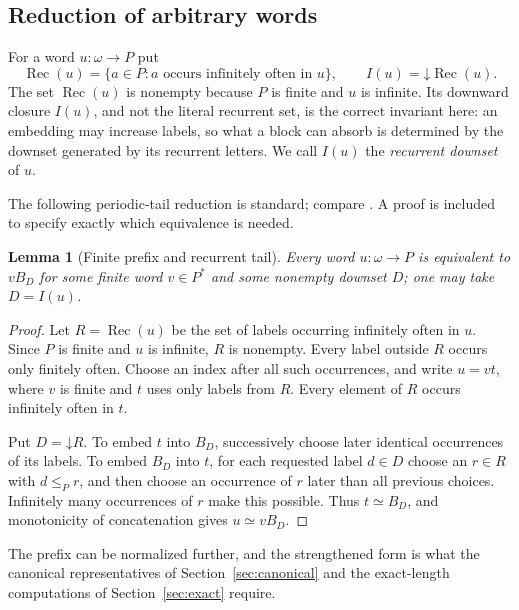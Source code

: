 \documentclass[11pt,a4paper]{article}
\numberwithin{equation}{section}
\newtheorem{lemma}[theorem]{Lemma}
\theoremstyle{definition}
\theoremstyle{remark}
\newcommand{\down}{\mathord{\downarrow}}
\newcommand{\eqv}{\simeq}
\newcommand{\rec}{\operatorname{Rec}}
\begin{document}
\subsection{Reduction of arbitrary words}
For a word $u:\omega\to P$ put
\begin{equation}\label{eq:recdef}
 \rec(u)=\{a\in P:a\text{ occurs infinitely often in }u\},
 \qquad
 I(u)=\down\rec(u).
\end{equation}
The set $\rec(u)$ is nonempty because $P$ is finite and $u$ is infinite. Its
downward closure $I(u)$, and not the literal recurrent set, is the correct
invariant here: an embedding may increase labels, so what a block can absorb
is determined by the downset generated by its recurrent letters. We call
$I(u)$ the \emph{recurrent downset} of $u$.

The following periodic-tail reduction is standard; compare
\cite[Propositions~3.3--3.4]{Altman2026}. A proof is included to specify
exactly which equivalence is needed.

\begin{lemma}[Finite prefix and recurrent tail]\label{lem:recurrent}
Every word $u:\omega\to P$ is equivalent to $vB_D$ for some finite word
$v\in P^*$ and some nonempty downset $D$; one may take $D=I(u)$.
\end{lemma}
\begin{proof}
Let $R=\rec(u)$ be the set of labels occurring infinitely often in $u$. Since $P$
is finite and $u$ is infinite, $R$ is nonempty. Every label outside $R$
occurs only finitely often. Choose an index after all such occurrences,
and write $u=vt$, where $v$ is finite and $t$ uses only labels from $R$.
Every element of $R$ occurs infinitely often in $t$.

Put $D=\down R$. To embed $t$ into $B_D$, successively choose later identical
occurrences of its labels. To embed $B_D$ into $t$, for each requested label
$d\in D$ choose an $r\in R$ with $d\le_P r$, and then choose an occurrence
of $r$ later than all previous choices. Infinitely many occurrences of $r$
make this possible. Thus $t\eqv B_D$, and monotonicity of concatenation
gives $u\eqv vB_D$.
\end{proof}

The prefix can be normalized further, and the strengthened form is what the
canonical representatives of Section~\ref{sec:canonical} and the exact-length
computations of Section~\ref{sec:exact} require.
\end{document}
